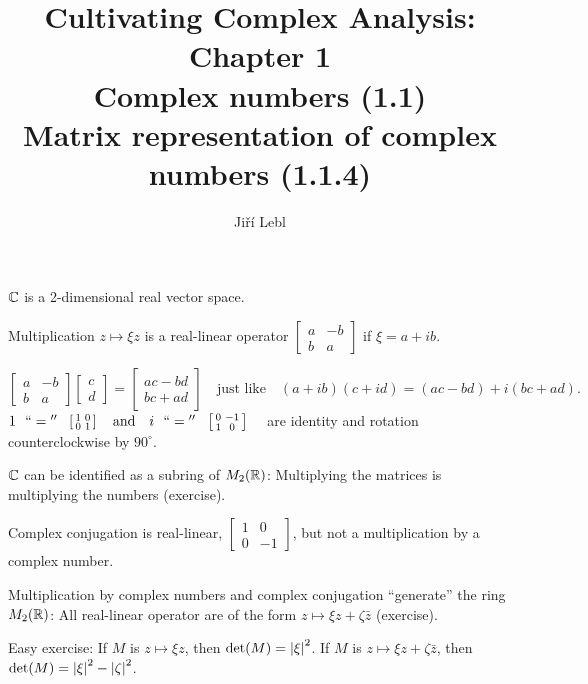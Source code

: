 \documentclass[10pt,aspectratio=169]{beamer}
\author{Ji\v{r}\'i Lebl}
\institute[OSU]{%
Departemento pri Matematiko de Oklahoma {\^S}tata Universitato}
\title{Cultivating Complex Analysis: Chapter 1\\Complex numbers (1.1)\\%
Matrix representation of complex numbers (1.1.4)}
\date{}
\begin{document}
\begin{frame}
\titlepage
\end{frame}

\begin{frame}
${\mathbb{C}}$ is a 2-dimensional real vector space.

\pause
\medskip

Multiplication $z \mapsto \xi z$ is a real-linear operator
\(
\left[
\begin{smallmatrix}
a & -b \\
b & a
\end{smallmatrix}
\right]
\) if $\xi = a+ib$.

\pause
\[
\begin{bmatrix}
a & -b \\
b & a
\end{bmatrix}
\begin{bmatrix}
c \\
d 
\end{bmatrix}
=
\begin{bmatrix}
ac-bd \\
bc+ad
\end{bmatrix}
\quad
\text{just like}
\quad
(a+ib)(c+id) = (ac-bd) + i(bc+ad) .
\]
\pause
\medskip
$
1 ~~ ``{}={}'' ~~
\left[
\begin{smallmatrix}
1 & 0 \\
0 & 1
\end{smallmatrix}
\right]
\quad \text{and} \quad
i ~~ ``{}={}'' ~~ \left[
\begin{smallmatrix}
0 & -1 \\
1 & 0
\end{smallmatrix} 
\right]
\quad
$
are identity and rotation counterclockwise by $90^{\circ}$.

\pause
\medskip

${\mathbb{C}}$ can be identified as a subring of $M_2({\mathbb{R}})$: Multiplying the matrices
is multiplying the numbers (exercise).

\medskip
\pause

Complex conjugation is real-linear,
$\left[ \begin{smallmatrix} 1 & 0 \\ 0 &
-1 \end{smallmatrix} \right]$,
but not a multiplication by a complex number.

\pause
\medskip

Multiplication by complex numbers and complex conjugation ``generate''
the ring $M_2({\mathbb{R}})$:  All real-linear operator are of the form
$z \mapsto \xi z + \zeta \bar{z}$ (exercise).

\pause
\medskip

Easy exercise:
If $M$ is $z \mapsto \xi z$, then $\det(M) = \left\lvert {\xi} \right\rvert^2$.
If $M$ is $z \mapsto \xi z+ \zeta \bar{z}$, then $\det(M) =
\left\lvert {\xi} \right\rvert^2-\left\lvert {\zeta} \right\rvert^2$.

\end{frame}
\end{document}
